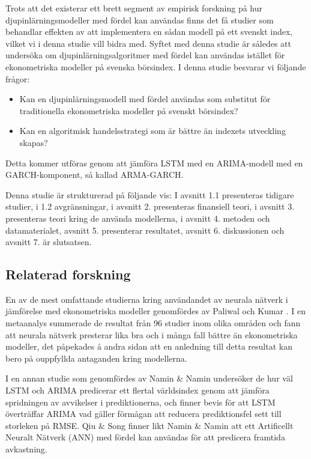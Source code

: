 \documentclass[11pt]{article}
\begin{document}
Trots att det existerar ett brett segment av empirisk forskning på hur djupinlärningsmodeller med fördel kan användas finns det få studier som behandlar effekten av att implementera en sådan modell på ett svenskt index, vilket vi i denna studie vill bidra med. Syftet med denna studie är således att undersöka om djupinlärningsalgoritmer med fördel kan användas istället för ekonometriska modeller på svenska börsindex. I denna studie besvarar vi följande frågor:

\begin{itemize}
    \item Kan en djupinlärningsmodell med fördel användas som substitut för traditionella ekonometriska modeller på svenskt börsindex?
    \item Kan en algoritmisk handelsstrategi som är bättre än indexets utveckling skapas?
\end{itemize}

Detta kommer utföras genom att jämföra LSTM med en ARIMA-modell med en GARCH-komponent, så kallad ARMA-GARCH. 

Denna studie är strukturerad på följande vis: I avsnitt 1.1 presenteras tidigare studier, i 1.2 avgränsningar, i avsnitt 2. presenteras finansiell teori, i avsnitt 3. presenteras teori kring de använda modellerna, i avsnitt 4. metoden och datamaterialet, avsnitt 5. presenterar resultatet, avsnitt 6. diskussionen och avsnitt 7. är slutsatsen. 

\subsection{Relaterad forskning}

En av de mest omfattande studierna kring användandet av neurala nätverk i jämförelse med ekonometriska modeller genomfördes av Paliwal och Kumar \parencite*{paliwal2009neural}. I en metaanalys summerade de resultat från 96 studier inom olika områden och fann att neurala nätverk presterar lika bra och i många fall bättre än ekonometriska modeller, det påpekades å andra sidan att en anledning till detta resultat kan bero på ouppfyllda antaganden kring modellerna. 

I en annan studie som genomfördes av Namin \& Namin \parencite*{siaminamini2018forecasting} undersöker de hur väl LSTM och ARIMA predicerar ett flertal världsindex genom att jämföra spridningen av avvikelser i prediktionerna, och finner bevis för att LSTM överträffar ARIMA vad gäller förmågan att reducera prediktionsfel sett till storleken på RMSE. Qiu \& Song \parencite*{10.1371/journal.pone.0155133} finner likt Namin \& Namin \parencite*{siaminamini2018forecasting} att ett Artificellt Neuralt Nätverk (ANN) med fördel kan användas för att predicera framtida avkastning.
\end{document}
